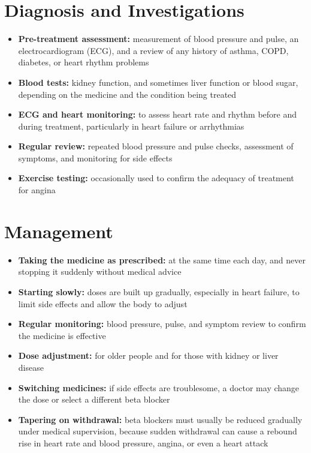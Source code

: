 \section*{Diagnosis and Investigations}
\begin{itemize}
    \item \textbf{Pre-treatment assessment:} measurement of blood pressure and pulse, an electrocardiogram (ECG), and a review of any history of asthma, COPD, diabetes, or heart rhythm problems
    \item \textbf{Blood tests:} kidney function, and sometimes liver function or blood sugar, depending on the medicine and the condition being treated
    \item \textbf{ECG and heart monitoring:} to assess heart rate and rhythm before and during treatment, particularly in heart failure or arrhythmias
    \item \textbf{Regular review:} repeated blood pressure and pulse checks, assessment of symptoms, and monitoring for side effects
    \item \textbf{Exercise testing:} occasionally used to confirm the adequacy of treatment for angina
\end{itemize}

\section*{Management}
\begin{itemize}
    \item \textbf{Taking the medicine as prescribed:} at the same time each day, and never stopping it suddenly without medical advice
    \item \textbf{Starting slowly:} doses are built up gradually, especially in heart failure, to limit side effects and allow the body to adjust
    \item \textbf{Regular monitoring:} blood pressure, pulse, and symptom review to confirm the medicine is effective
    \item \textbf{Dose adjustment:} for older people and for those with kidney or liver disease
    \item \textbf{Switching medicines:} if side effects are troublesome, a doctor may change the dose or select a different beta blocker
    \item \textbf{Tapering on withdrawal:} beta blockers must usually be reduced gradually under medical supervision, because sudden withdrawal can cause a rebound rise in heart rate and blood pressure, angina, or even a heart attack
\end{itemize}

